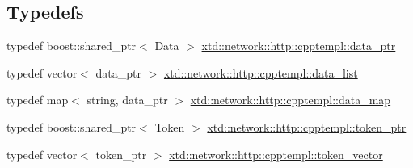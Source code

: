 \subsection*{Typedefs}
\begin{DoxyCompactItemize}
\item 
typedef boost\-::shared\-\_\-ptr$<$ Data $>$ \hyperlink{namespacextd_1_1network_1_1http_1_1cpptempl_ad2f49991f1902699a98cf62bf0ae7ce6}{xtd\-::network\-::http\-::cpptempl\-::data\-\_\-ptr}
\item 
typedef vector$<$ data\-\_\-ptr $>$ \hyperlink{namespacextd_1_1network_1_1http_1_1cpptempl_aff1b51bcf8064f69c85dd4833c1853b4}{xtd\-::network\-::http\-::cpptempl\-::data\-\_\-list}
\item 
typedef map$<$ string, data\-\_\-ptr $>$ \hyperlink{namespacextd_1_1network_1_1http_1_1cpptempl_a638d1d81c8fb63c0bbafd508d6a2a007}{xtd\-::network\-::http\-::cpptempl\-::data\-\_\-map}
\item 
typedef boost\-::shared\-\_\-ptr$<$ Token $>$ \hyperlink{namespacextd_1_1network_1_1http_1_1cpptempl_a09d1bd238d03342e60f0c20c679c0c88}{xtd\-::network\-::http\-::cpptempl\-::token\-\_\-ptr}
\item 
typedef vector$<$ token\-\_\-ptr $>$ \hyperlink{namespacextd_1_1network_1_1http_1_1cpptempl_a38606cfbbfe81ed46ea9b0cf064de956}{xtd\-::network\-::http\-::cpptempl\-::token\-\_\-vector}
\end{DoxyCompactItemize}
